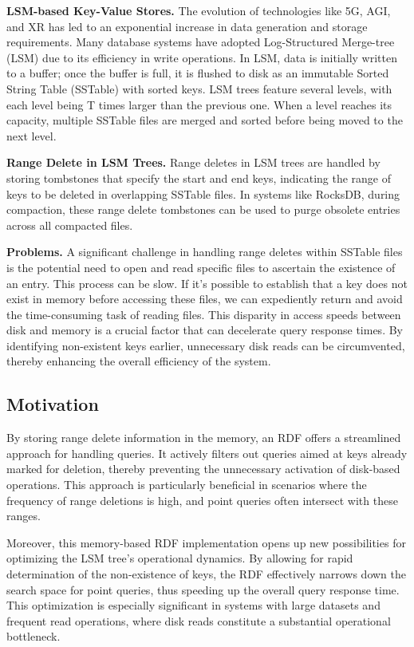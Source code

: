 
\textbf{LSM-based Key-Value Stores.} The evolution of technologies like 5G, AGI, and XR has led to an exponential increase in data generation and storage requirements. Many database systems have adopted Log-Structured Merge-tree (LSM) due to its efficiency in write operations. In LSM, data is initially written to a buffer; once the buffer is full, it is flushed to disk as an immutable Sorted String Table (SSTable) with sorted keys. LSM trees feature several levels, with each level being T times larger than the previous one. When a level reaches its capacity, multiple SSTable files are merged and sorted before being moved to the next level.

\textbf{Range Delete in LSM Trees.} Range deletes in LSM trees are handled by storing tombstones that specify the start and end keys, indicating the range of keys to be deleted in overlapping SSTable files. In systems like RocksDB, during compaction, these range delete tombstones can be used to purge obsolete entries across all compacted files.

\textbf{Problems.} 
A significant challenge in handling range deletes within SSTable files is the potential need to open and read specific files to ascertain the existence of an entry. This process can be slow. If it's possible to establish that a key does not exist in memory before accessing these files, we can expediently return and avoid the time-consuming task of reading files. This disparity in access speeds between disk and memory is a crucial factor that can decelerate query response times. By identifying non-existent keys earlier, unnecessary disk reads can be circumvented, thereby enhancing the overall efficiency of the system.


\subsection{Motivation}
By storing range delete information in the memory,  an RDF offers a streamlined approach for handling queries. It actively filters out queries aimed at keys already marked for deletion, thereby preventing the unnecessary activation of disk-based operations. This approach is particularly beneficial in scenarios where the frequency of range deletions is high, and point queries often intersect with these ranges.

Moreover, this memory-based RDF implementation opens up new possibilities for optimizing the LSM tree's operational dynamics. By allowing for rapid determination of the non-existence of keys, the RDF effectively narrows down the search space for point queries, thus speeding up the overall query response time. This optimization is especially significant in systems with large datasets and frequent read operations, where disk reads constitute a substantial operational bottleneck.

